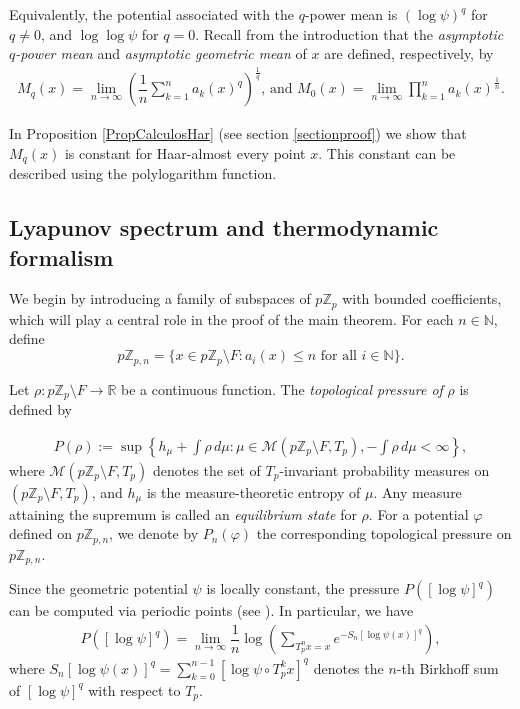 \documentclass[11pt]{amsart}
\theoremstyle{remark}
\numberwithin{equation}{section}
\newcommand{\N}{\mathbb{N}}
\newcommand{\Z}{\mathbb{Z}}
\newcommand{\Zp}{\mathbb{Z}_p}
\begin{document}
    Equivalently, the potential associated with the $q$-power mean is $(\log\psi)^{q}$ for $q\neq 0$, and $\log \log \psi$ for $q=0$.
Recall from the introduction that the \textit{asymptotic $q$-power mean} and \textit{asymptotic geometric mean} of $x$ are defined, respectively, by
\begin{align*}
    M_{q}(x)=\lim_{n\to \infty} \left(\dfrac{1}{n}\sum_{k=1}^n a_k(x)^q \right)^{\frac{1}{q}}\text{, and }M_{0}(x)=\lim_{n\to\infty}\prod^{n}_{k=1}a_{k}(x)^{\frac{1}{n}}.
\end{align*}

In Proposition \ref{PropCalculosHar} (see section \ref{sectionproof}) we show that $M_q(x)$ is constant for Haar-almost every point $x$. This constant can be described using the polylogarithm function.



\subsection{Lyapunov spectrum and thermodynamic formalism}

We begin by introducing a family of subspaces of $p\Z_p$ with bounded coefficients, which will play a central role in the proof of the main theorem. For each $n\in \N$,  define  
$$p\Z_{p,n}=\{x \in p\Z_p\setminus F: a_i(x) \leq n \text{ for all }i\in \N\}.$$ 


Let $\rho:p\Zp \setminus F\to \mathbb{R}$ be a continuous function. The \emph{topological pressure of} $\rho$ is defined by  

\begin{align}\label{DefPressure2}
    P(\rho) := \sup \left\{ h_{\mu} + \int \rho \, d\mu : \mu \in \mathcal{M}(p\Zp\setminus F,T_{p}), -\int \rho \, d\mu < \infty \right\},
\end{align}where \( \mathcal{M}(p\Zp\setminus F,T_{p}) \) denotes the set of \( T_{p} \)-invariant probability measures on $(p\Zp\setminus F,T_{p})$, and \( h_{\mu} \) is the measure-theoretic entropy of \( \mu \). Any measure attaining the supremum is called an \textit{equilibrium state} for \( \rho\). For a potential $\varphi$ defined on $p\Z_{p,n}$, we denote by $P_n(\varphi)$ the corresponding topological pressure on $p\Z_{p,n}$. 

Since the geometric potential $\psi$ is locally constant, the pressure $P([\log\psi]^{q})$ can be computed via periodic points (see \cite[Cor. 1]{bs}). In particular, we have
\begin{align}\label{EcuPressure2}
    P([\log\psi]^{q})=\lim_{n\rightarrow \infty}\dfrac{1}{n}\log\left(\sum_{T_{p}^{n}x=x}e^{-S_{n} [\log \psi(x)]^{q}}\right),
\end{align} where $S_{n} [\log \psi(x)]^{q}=\sum^{n-1}_{k=0}[\log\psi\circ T^{k}_{p}x]^{q}$ denotes the $n$-th Birkhoff sum of $[\log \psi]^{q}$ with respect to $T_p$.
\end{document}
